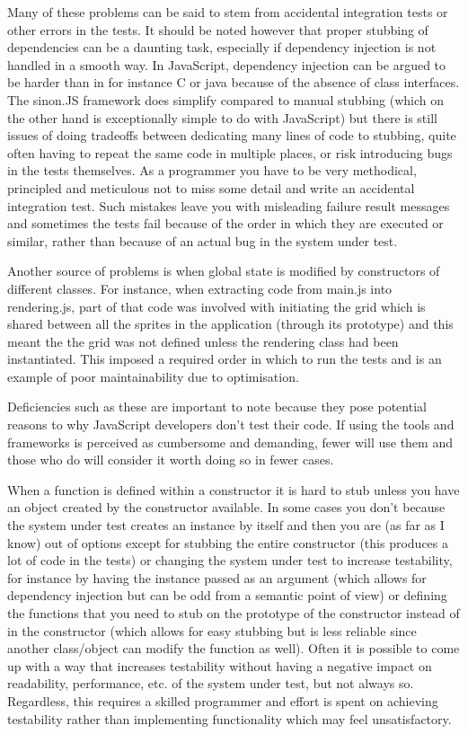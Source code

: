 \documentclass[11pt]{article}
\begin{document}
Many of these problems can be said to stem from accidental integration tests or other errors in the tests. It should be noted however that proper stubbing of dependencies can be a daunting task, especially if dependency injection is not handled in a smooth way. In JavaScript, dependency injection can be argued to be harder than in for instance C or java because of the absence of class interfaces. The sinon.JS framework does simplify compared to manual stubbing (which on the other hand is exceptionally simple to do with JavaScript) but there is still issues of doing tradeoffs between dedicating many lines of code to stubbing, quite often having to repeat the same code in multiple places, or risk introducing bugs in the tests themselves. As a programmer you have to be very methodical, principled and meticulous not to miss some detail and write an accidental integration test. Such mistakes leave you with misleading failure result messages and sometimes the tests fail because of the order in which they are executed or similar, rather than because of an actual bug in the system under test.

Another source of problems is when global state is modified by constructors of different classes. For instance, when extracting code from main.js into rendering.js, part of that code was involved with initiating the grid which is shared between all the sprites in the application (through its prototype) and this meant the the grid was not defined unless the rendering class had been instantiated. This imposed a required order in which to run the tests and is an example of poor maintainability due to optimisation.

Deficiencies such as these are important to note because they pose potential reasons to why JavaScript developers don't test their code. If using the tools and frameworks is perceived as cumbersome and demanding, fewer will use them and those who do will consider it worth doing so in fewer cases.

When a function is defined within a constructor it is hard to stub unless you have an object created by the constructor available. In some cases you don't because the system under test creates an instance by itself and then you are (as far as I know) out of options except for stubbing the entire constructor (this produces a lot of code in the tests) or changing the system under test to increase testability, for instance by having the instance passed as an argument (which allows for dependency injection but can be odd from a semantic point of view) or defining the functions that you need to stub on the prototype of the constructor instead of in the constructor (which allows for easy stubbing but is less reliable since another class/object can modify the function as well). Often it is possible to come up with a way that increases testability without having a negative impact on readability, performance, etc. of the system under test, but not always so. Regardless, this requires a skilled programmer and effort is spent on achieving testability rather than implementing functionality which may feel unsatisfactory.
\end{document}
